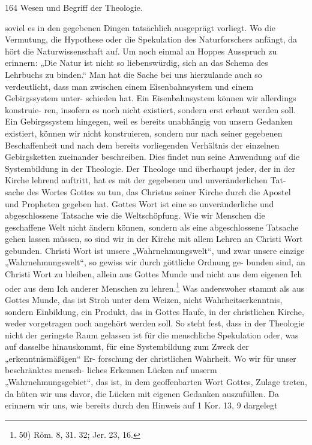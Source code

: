 164 \hfill Wesen und Begriff der Theologie.

soviel es in den gegebenen Dingen tatsächlich ausgeprägt
vorliegt. Wo die Vermutung, die Hypothese oder die Spekulation
des Naturforschers anfängt, da hört die Naturwissenschaft auf. Um
noch einmal an Hoppes Ausspruch zu erinnern: „Die Natur ist nicht
so liebenswürdig, sich an das Schema des Lehrbuchs zu binden.“
Man hat die Sache bei uns hierzulande auch so verdeutlicht, dass
man zwischen einem Eisenbahnsystem und einem Gebirgssystem unter-
schieden hat. Ein Eisenbahnsystem können wir allerdings konstruie-
ren, insofern es noch nicht existiert, sondern erst erbaut werden soll.
Ein Gebirgssystem hingegen, weil es bereits unabhängig von unsern
Gedanken existiert, können wir nicht konstruieren, sondern nur nach
seiner gegebenen Beschaffenheit und nach dem bereits vorliegenden
Verhältnis der einzelnen Gebirgsketten zueinander beschreiben.
Dies findet nun seine Anwendung auf die Systembildung in der
Theologie. Der Theologe und überhaupt jeder, der in der Kirche
lehrend auftritt, hat es mit der gegebenen und unveränderlichen Tat-
sache des Wortes Gottes zu tun, das Christus seiner Kirche durch
die Apostel und Propheten gegeben hat. Gottes Wort ist eine so
unveränderliche und abgeschlossene Tatsache wie die Weltschöpfung.
Wie wir Menschen die geschaffene Welt nicht ändern können, sondern
als eine abgeschlossene Tatsache gehen lassen müssen, so sind wir in
der Kirche mit allem Lehren an Christi Wort gebunden. Christi
Wort ist unsere „Wahrnehmungswelt“, und zwar unsere einzige
„Wahrnehmungswelt“, so gewiss wir durch göttliche Ordnung ge-
bunden sind, an Christi Wort zu bleiben, allein aus Gottes
Munde und nicht aus dem eigenen Ich oder aus dem Ich anderer
Menschen zu lehren.\footnote{50) Röm. 8, 31. 32; Jer. 23, 16.} Was anderswoher stammt als aus Gottes
Munde, das ist Stroh unter dem Weizen, nicht Wahrheitserkenntnis,
sondern Einbildung, ein Produkt, das in Gottes Haufe, in der
christlichen Kirche, weder vorgetragen noch angehört werden soll. So
steht fest, dass in der Theologie nicht der geringste Raum gelassen ist
für die menschliche Spekulation oder, was auf dasselbe hinauskommt,
für eine Systembildung zum Zweck der „erkenntnismäßigen“ Er-
forschung der christlichen Wahrheit. Wo wir für unser beschränktes mensch-
liches Erkennen Lücken auf unserm „Wahrnehmungsgebiet“, das ist,
in dem geoffenbarten Wort Gottes, Zulage treten, da hüten wir uns
davor, die Lücken mit eigenen Gedanken auszufüllen. Da erinnern
wir uns, wie bereits durch den Hinweis auf 1 Kor. 13, 9 dargelegt